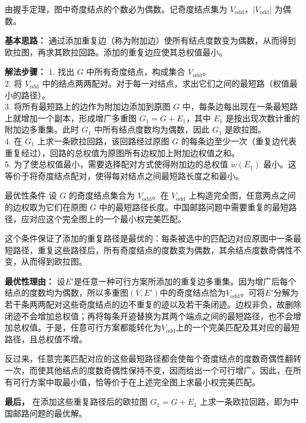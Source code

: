 \documentclass[lang=cn,11pt]{elegantbook}
\begin{document}
由握手定理，图中奇度结点的个数必为偶数。记奇度结点集为 $V_{\text{odd}}$，$|V_{\text{odd}}|$ 为偶数。

\textbf{基本思路：} 通过添加重复边（称为附加边）使所有结点度数变为偶数，从而得到欧拉图，再求其欧拉回路。添加的重复边应使其总权值最小。

\textbf{解法步骤：}
1. 找出 $G$ 中所有奇度结点，构成集合 $V_{\text{odd}}$。\\
    2. 将 $V_{\text{odd}}$ 中的结点两两配对。对于每一对结点，求出它们之间的最短路（权值最小的路径）。\\
    3. 将所有最短路上的边作为附加边添加到原图 $G$ 中，每条边每出现在一条最短路上就增加一个副本，形成增广多重图 $G_1 = G + E_1$，其中 $E_1$ 是按出现次数计重的附加边多重集。此时 $G_1$ 中所有结点度数均为偶数，因此 $G_1$ 是欧拉图。\\
    4. 在 $G_1$ 上求一条欧拉回路，该回路经过原图 $G$ 的每条边至少一次（重复边代表重复经过），回路的总权值为原图所有边权加上附加边权值之和。\\
    5. 为了使总权值最小，需要选择配对方式使得附加边的总权值 $w(E_1)$ 最小。这等价于将奇度结点配对，使得每对结点之间最短路长度之和最小。

\begin{theorem}{最优性条件}
    设 $G$ 的奇度结点集合为 $V_{\text{odd}}$。在 $V_{\text{odd}}$ 上构造完全图，任意两点之间的边权取为它们在原图 $G$ 中的最短路径长度。中国邮路问题中需要重复的最短路径，应对应这个完全图上的一个最小权完美匹配。
\end{theorem}
    这个条件保证了添加的重复路径是最优的：每条被选中的匹配边对应原图中一条最短路径，重复这些路径后，所有奇度结点的度数变为偶数，其余结点度数奇偶性不变，从而得到欧拉图。

    \textbf{最优性理由：}
    设$E'$是任意一种可行方案所添加的重复边多重集。因为增广后每个结点的度数均为偶数，所以多重图$(V,E')$中的奇度结点恰为$V_{\text{odd}}$。可将$E'$分解为若干条两两配对这些奇度结点的边不重复的迹以及若干条闭迹。边权非负，故删除闭迹不会增加总权值；再将每条开迹替换为其两个端点之间的最短路径，也不会增加总权值。于是，任意可行方案都能转化为$V_{\text{odd}}$上的一个完美匹配及其对应的最短路径，且总权值不增。

    反过来，任意完美匹配对应的这些最短路径都会使每个奇度结点的度数奇偶性翻转一次，而使其他结点的度数奇偶性保持不变，因而给出一个可行增广。因此，在所有可行方案中取最小值，恰等价于在上述完全图上求最小权完美匹配。

    \textbf{最后，} 在添加这些重复路径后的欧拉图 $G_1 = G + E_1$ 上求一条欧拉回路，即为中国邮路问题的最优解。
\end{document}
